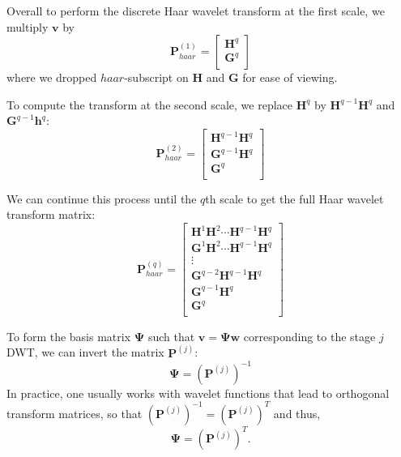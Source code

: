 Overall to perform the discrete Haar wavelet transform at the first scale, we multiply $\bm v$ by
\begin{equation*}
  \bm P^{(1)}_{haar} = \begin{bmatrix}
    \bm H^q \\
    \bm G^q \\
  \end{bmatrix}
\end{equation*}
where we dropped $haar$-subscript on $\bm H$ and $\bm G$ for ease of viewing.

To compute the transform at the second scale, we replace $\bm H^q$ by $\bm H^{q-1}\bm H^q$ and $\bm G^{q-1}\bm h^q$:
\begin{equation*}
  \bm P^{(2)}_{haar} = \begin{bmatrix}
    \bm H^{q-1} \bm H^q \\
    \bm G^{q-1} \bm H^q \\
    \bm G^q \\
  \end{bmatrix}
\end{equation*}

We can continue this process until the $q$th scale to get the full Haar wavelet transform matrix:
\begin{equation*}
  \bm P^{(q)}_{haar} = \begin{bmatrix}
    \bm H^1 \bm H^2 \cdots \bm H^{q-1} \bm H^q \\
    \bm G^1 \bm H^2 \cdots \bm H^{q-1} \bm H^q \\
    \vdots\\
    \bm G^{q-2} \bm H^{q-1} \bm H^q \\
    \bm G^{q-1} \bm H^q \\
    \bm G^q \\
  \end{bmatrix}
\end{equation*}

To form the basis matrix $\bm\Psi$ such that $\bm v = \bm\Psi\bm w$ corresponding to the stage $j$ DWT, we can invert the matrix $\bm P^{(j)}$:
\begin{equation*}
  \bm\Psi = \left(\bm P^{(j)}\right)^{-1}
\end{equation*}
In practice, one usually works with wavelet functions that lead to orthogonal transform matrices, so that $\left(\bm P^{(j)}\right)^{-1}=\left(\bm P^{(j)}\right)^T$ and thus,
\begin{equation*}
  \bm\Psi = \left(\bm P^{(j)}\right)^T.
\end{equation*}

